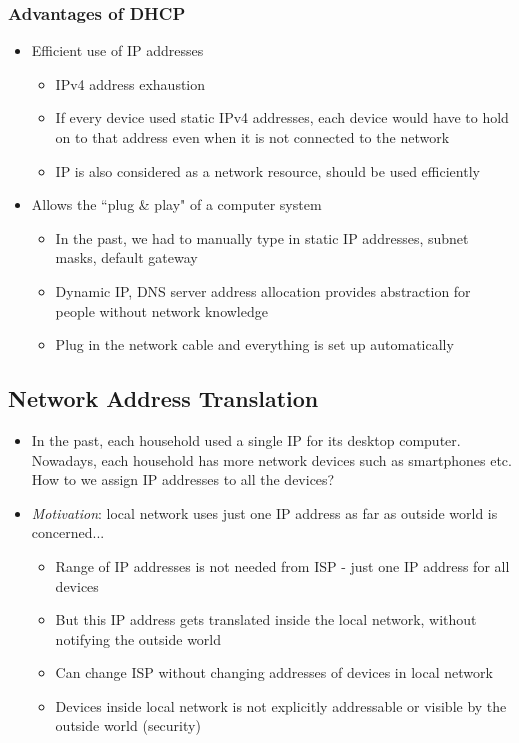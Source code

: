 \subsubsection{Advantages of DHCP}
\begin{itemize}
	\item Efficient use of IP addresses
	\begin{itemize}
		\item IPv4 address exhaustion
		\item If every device used static IPv4 addresses, each device would have to hold on to that address even when it is not connected to the network
		\item IP is also considered as a network resource, should be used efficiently
	\end{itemize}
	\item Allows the ``plug \& play" of a computer system
	\begin{itemize}
		\item In the past, we had to manually type in static IP addresses, subnet masks, default gateway
		\item Dynamic IP, DNS server address allocation provides abstraction for people without network knowledge
		\item Plug in the network cable and everything is set up automatically
	\end{itemize}
\end{itemize}

\subsection{Network Address Translation}
\begin{itemize}
	\item In the past, each household used a single IP for its desktop computer. Nowadays, each household has more network devices such as smartphones etc. How to we assign IP addresses to all the devices?
	\item \textit{Motivation}: local network uses just one IP address as far as outside world is concerned...
	\begin{itemize}
		\item Range of IP addresses is not needed from ISP - just one IP address for all devices
		\item But this IP address gets translated inside the local network, without notifying the outside world
		\item Can change ISP without changing addresses of devices in local network
		\item Devices inside local network is not explicitly addressable or visible by the outside world (security)
	\end{itemize}
\end{itemize}


